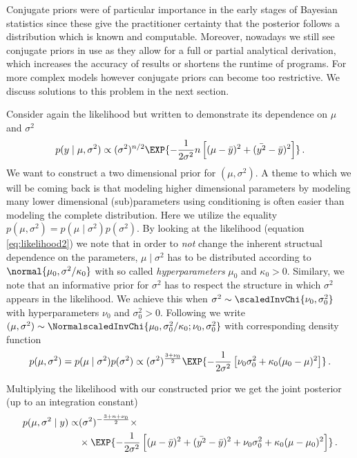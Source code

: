 Conjugate priors were of particular importance in the early stages of Bayesian statistics since these give the practitioner certainty that the posterior follows a distribution which is known and computable. Moreover, nowadays we still see conjugate priors in use as they allow for a full or partial analytical derivation, which increases the accuracy of results or shortens the runtime of programs. For more complex models however conjugate priors can become too restrictive. We discuss solutions to this problem in the next section.

Consider again the likelihood but written to demonstrate its dependence on $\mu$ and $\sigma^2$
\begin{align}
  p(y \mid \mu, \sigma^2) \propto (\sigma^2)^{n/2} \EXP{-\frac{1}{2\sigma^2} n\left[ (\mu - \bar{y})^2 + (\bar{y^2} - \bar{y})^2 \right]} \,.
  \label{eq:likelihood2}
\end{align}
We want to construct a two dimensional prior for $(\mu, \sigma^2)$.
A theme to which we will be coming back is that modeling higher dimensional parameters by modeling many lower dimensional (sub)parameters using conditioning is often easier than modeling the complete distribution.
Here we utilize the equality $p(\mu, \sigma^2) = p(\mu \mid \sigma^2) p(\sigma^2)$.
By looking at the likelihood (equation \ref{eq:likelihood2}) we note that in order to \emph{not} change the inherent structual dependence on the parameters, $\mu \mid \sigma^2$ has to be distributed according to $\normal{\mu_0, \sigma^2 / \kappa_0}$ with so called \emph{hyperparameters} $\mu_0$ and $\kappa_0 > 0$.
Similary, we note that an informative prior for $\sigma^2$ has to respect the structure in which $\sigma^2$ appears in the likelihood.
We achieve this when $\sigma^2 \sim \scaledInvChi{\nu_0, \sigma_0^2}$ with hyperparameters $\nu_0$ and $\sigma_0^2 > 0$.
Following \citet{gelmanbda04} we write $(\mu, \sigma^2) \sim \NormalscaledInvChi{\mu_0, \sigma_0^2 / \kappa_0; \nu_0, \sigma_0^2}$ with corresponding density function
\begin{align}
  p(\mu, \sigma^2) = p(\mu \mid \sigma^2) p(\sigma^2) \propto (\sigma^2)^{\frac{3 + \nu_0}{2}} \EXP{-\frac{1}{2\sigma^2} \left[\nu_0 \sigma_0^2 + \kappa_0(\mu_0 - \mu)^2 \right]} \,.
\end{align}

Multiplying the likelihood with our constructed prior we get the joint posterior (up to an integration constant)
\begin{align}
  p(\mu, \sigma^2 \mid y) \propto& (\sigma^2)^{-\frac{3 + n + \nu_0}{2}} \times\\
  & \times \EXP{-\frac{1}{2 \sigma^2} \left[ (\mu - \bar{y})^2 + (\bar{y^2} - \bar{y})^2 + \nu_0\sigma_0^2 + \kappa_0(\mu - \mu_0)^2 \right]} \,.
  \label{eq:conjugate_posterior}
\end{align}

